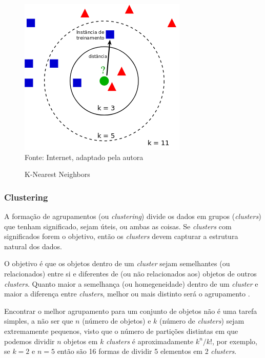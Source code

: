 \begin{figure}[!htb]
     \centering
           \caption{K-Nearest Neighbors}\label{fig:knn} 
           \includegraphics[scale=0.80]{figuras/knn.png}
           \\Fonte: Internet, adaptado pela autora
\end{figure}
        

\subsubsection{Clustering}\label{subsubsec:clustering}
A formação de agrupamentos (ou \textit{clustering}) divide os dados em grupos (\textit{clusters}) que tenham significado, sejam úteis, ou ambas as coisas. Se \textit{clusters} com significados forem o objetivo, então os \textit{clusters} devem capturar a estrutura natural dos dados.

O objetivo é que os objetos dentro de um \textit{cluster} sejam semelhantes (ou relacionados) entre si e diferentes de (ou não relacionados aos) objetos de outros \textit{clusters}. Quanto maior a semelhança (ou homegeneidade) dentro de um \textit{cluster} e maior a diferença entre \textit{clusters}, melhor ou mais distinto será o agrupamento \cite{pang2009}.

Encontrar o melhor agrupamento para um conjunto de objetos não é uma tarefa simples, a não ser que \textbf{\({n}\)} (número de objetos) e \textbf{\({k}\)} (número de \textit{clusters}) sejam extremamente pequenos, visto que o número de partições distintas em que podemos dividir \textbf{\({n}\)} objetos em \textbf{\({k}\)} \textit{clusters} é aproximadamente \textbf{\({k^n/k!}\)}, por exemplo, se \textbf{\({k=2}\)} e \textbf{\({n=5}\)} então são 16 formas de dividir 5 elementos em 2 \textit{clusters}.

